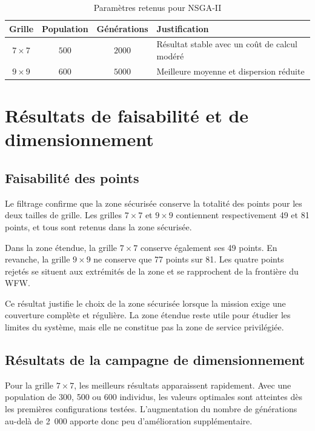 \begin{table}[H]
\centering
\caption{Paramètres retenus pour NSGA-II}
\label{tab:parametres_nsga_nouveau}
\begin{tabular}{|c|c|c|p{6.0cm}|}
\hline
\textbf{Grille} & \textbf{Population} & \textbf{Générations} & \textbf{Justification} \\
\hline
$7\times7$ & $500$ & $2000$ & Résultat stable avec un coût de calcul modéré \\
\hline
$9\times9$ & $600$ & $5000$ & Meilleure moyenne et dispersion réduite \\
\hline
\end{tabular}
\end{table}

\section{Résultats de faisabilité et de dimensionnement}
\label{sec:resultats_dimensionnement}

\subsection{Faisabilité des points}

Le filtrage confirme que la zone sécurisée conserve la totalité des points pour les deux tailles de grille. Les grilles $7\times7$ et $9\times9$ contiennent respectivement 49 et 81 points, et tous sont retenus dans la zone sécurisée.

Dans la zone étendue, la grille $7\times7$ conserve également ses 49 points. En revanche, la grille $9\times9$ ne conserve que 77 points sur 81. Les quatre points rejetés se situent aux extrémités de la zone et se rapprochent de la frontière du WFW.

Ce résultat justifie le choix de la zone sécurisée lorsque la mission exige une couverture complète et régulière. La zone étendue reste utile pour étudier les limites du système, mais elle ne constitue pas la zone de service privilégiée.

\subsection{Résultats de la campagne de dimensionnement}

Pour la grille $7\times7$, les meilleurs résultats apparaissent rapidement. Avec une population de 300, 500 ou 600 individus, les valeurs optimales sont atteintes dès les premières configurations testées. L'augmentation du nombre de générations au-delà de 2~000 apporte donc peu d'amélioration supplémentaire.

